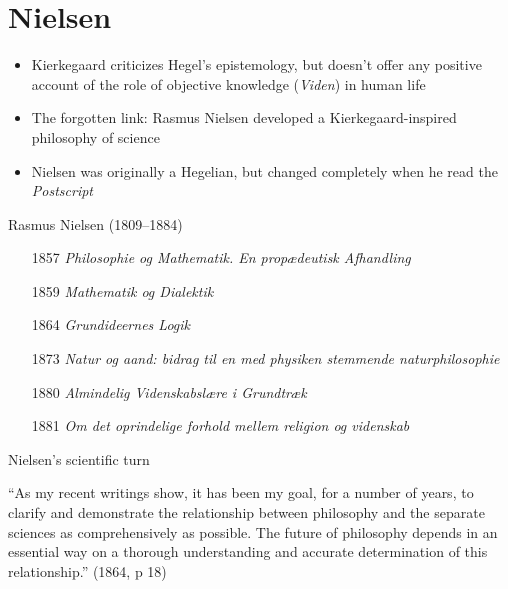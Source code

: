 \documentclass[ignorenonframetext, ]{beamer}
\begin{document}
\section{Nielsen}

\begin{frame}

  \begin{itemize}
  \item Kierkegaard criticizes Hegel's epistemology, but doesn't offer
    any positive account of the role of objective knowledge
    (\emph{Viden}) in human life
  \item The forgotten link: Rasmus Nielsen developed a
    Kierkegaard-inspired philosophy of science
  \item Nielsen was originally a Hegelian, but changed completely when
    he read the \emph{Postscript}
  \end{itemize}

\end{frame}

\begin{frame}{Rasmus Nielsen (1809--1884)}

  \begin{itemize}
  \item[1857] \emph{Philosophie og Mathematik. En propædeutisk
      Afhandling}
  \item[1859] \textit{Mathematik og Dialektik}
  \item[1864] \textit{Grundideernes Logik}
  \item[1873] \textit{Natur og aand: bidrag til en med physiken
      stemmende naturphilosophie}
  \item[1880] \emph{Almindelig Videnskabslære i Grundtræk}
  \item[1881] \emph{Om det oprindelige forhold mellem religion og
      videnskab}
  \end{itemize}
    
\end{frame}

\begin{frame}{Nielsen's scientific turn}

  ``As my recent writings show, it has been my goal, for a number of
  years, to clarify and demonstrate the relationship between
  philosophy and the separate sciences as comprehensively as
  possible. The future of philosophy depends in an essential way on a
  thorough understanding and accurate determination of this
  relationship.'' (1864, p 18)
  
\end{frame}
\end{document}
